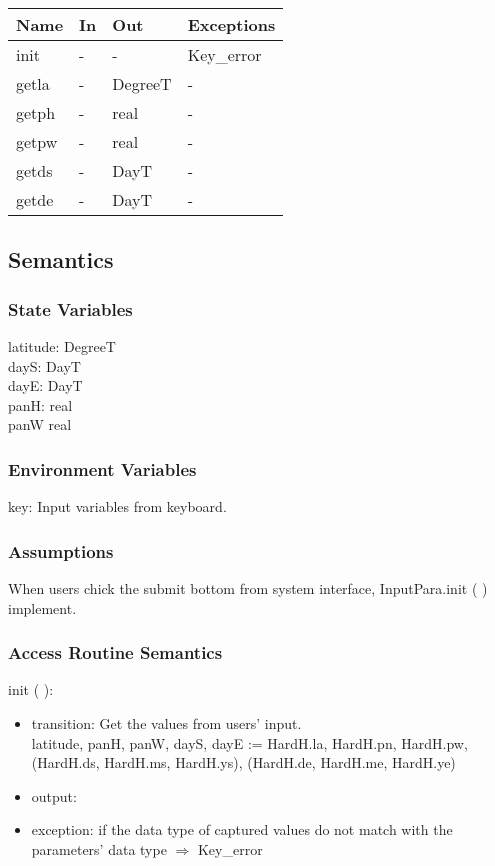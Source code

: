 \documentclass[12pt, titlepage]{article}
\begin{document}
\begin{center}
\begin{tabular}{p{2cm} p{4cm} p{4cm} p{2cm}}
\hline
\textbf{Name} & \textbf{In} & \textbf{Out} & \textbf{Exceptions} \\
\hline 
init & - & - & Key\_error \\
getla & - & DegreeT & - \\
getph & - & real & - \\
getpw & - & real & - \\
getds & - & DayT & - \\
getde & - & DayT & - \\


\hline
\end{tabular}
\end{center}


\subsection{Semantics}

\subsubsection{State Variables}
latitude: DegreeT\\
dayS: DayT\\
dayE: DayT\\
panH: real\\
panW real


\subsubsection{Environment Variables}
key: Input variables from keyboard.

\subsubsection{Assumptions}
When users chick the submit bottom from system interface, InputPara.init ( ) implement.

\subsubsection{ Access Routine Semantics}

\noindent  init ( ):
\begin{itemize}
\item transition: Get the values from users' input.\\
latitude, panH, panW, dayS, dayE := HardH.la, HardH.pn, HardH.pw, (HardH.ds, HardH.ms, HardH.ys), (HardH.de, HardH.me, HardH.ye)
\item output:
\item exception: if the data type of captured values do not match with the parameters' data type $\Rightarrow$ Key\_error
\end{itemize}
\end{document}
